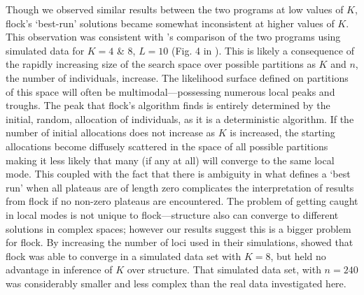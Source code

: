 Though we observed similar results
between the two programs at low values of $K$, {\sc flock}'s `best-run' solutions became somewhat inconsistent at higher values of $K$.
This observation was consistent with \citet{Duc&Tur2012}'s comparison of the 
two programs using simulated data 
for $K=4$ \& 8, $L=10$ (Fig. 4 in \citet{Duc&Tur2012}). 
This is likely a consequence of the rapidly increasing size of the search space over possible 
partitions as $K$ and $n$, the number of individuals, increase. 
The likelihood surface defined on partitions of this space will often
be multimodal---possessing numerous local peaks and troughs.
The peak that  {\sc flock}'s algorithm finds is entirely determined by the initial, random, allocation of 
individuals, as it is a deterministic algorithm.
If the number of initial allocations does not increase
as $K$ is increased, the starting allocations become diffusely scattered in the space of all
possible partitions making it less likely that many (if any at all) will converge to the same local mode. 
This coupled with the fact that there is 
ambiguity in what defines a `best run' when all plateaus are of length zero complicates the interpretation
of results from {\sc flock} if no non-zero plateaus are encountered. The problem of getting 
caught in local modes is not unique to {\sc flock}---{\sc structure} also can converge to 
different solutions in complex spaces; however our results suggest this is a bigger problem for {\sc flock}.
By increasing the number of loci used in their simulations, \citet{Duc&Tur2012} showed  that 
{\sc flock} was able to converge in a simulated data set with $K=8$, but held no advantage in inference of $K$ over {\sc structure}. That simulated data set, with $n=240$ was considerably smaller and less complex than the real data investigated here.

